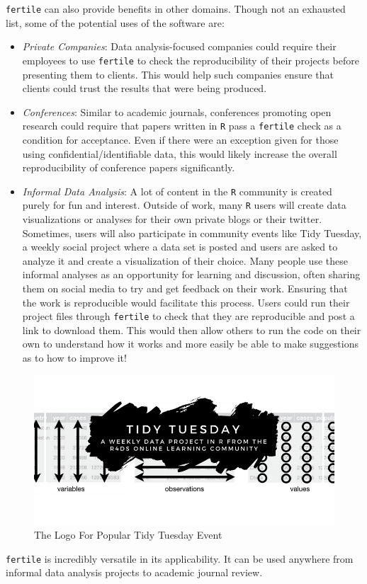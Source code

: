 \documentclass[12pt,twoside]{reedthesis}
\begin{document}
\texttt{fertile} can also provide benefits in other domains. Though not an exhausted list, some of the potential uses of the software are:
\begin{itemize}
\item
  \emph{Private Companies}: Data analysis-focused companies could require their employees to use \texttt{fertile} to check the reproducibility of their projects before presenting them to clients. This would help such companies ensure that clients could trust the results that were being produced.
\item
  \emph{Conferences}: Similar to academic journals, conferences promoting open research could require that papers written in \texttt{R} pass a \texttt{fertile} check as a condition for acceptance. Even if there were an exception given for those using confidential/identifiable data, this would likely increase the overall reproducibility of conference papers significantly.
\item
  \emph{Informal Data Analysis}: A lot of content in the \texttt{R} community is created purely for fun and interest. Outside of work, many \texttt{R} users will create data visualizations or analyses for their own private blogs or their twitter. Sometimes, users will also participate in community events like Tidy Tuesday, a weekly social project where a data set is posted and users are asked to analyze it and create a visualization of their choice. Many people use these informal analyses as an opportunity for learning and discussion, often sharing them on social media to try and get feedback on their work. Ensuring that the work is reproducible would facilitate this process. Users could run their project files through \texttt{fertile} to check that they are reproducible and post a link to download them. This would then allow others to run the code on their own to understand how it works and more easily be able to make suggestions as to how to improve it!
\end{itemize}
\begin{figure}
\includegraphics[width=1\linewidth]{figure/tidytuesday} \caption{The Logo For Popular Tidy Tuesday Event}\label{fig:unnamed-chunk-66}
\end{figure}
\texttt{fertile} is incredibly versatile in its applicability. It can be used anywhere from informal data analysis projects to academic journal review.
\end{document}
